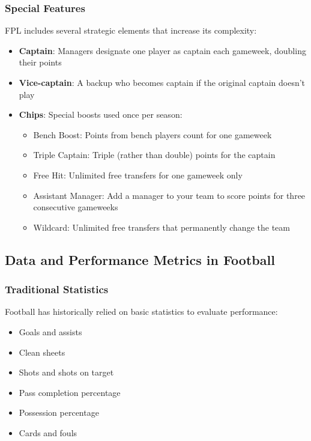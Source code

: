 \subsubsection{Special Features} \label{ch:special_features}

FPL includes several strategic elements that increase its complexity:
\begin{itemize}
    \item \textbf{Captain}: Managers designate one player as captain each gameweek, doubling their points
    \item \textbf{Vice-captain}: A backup who becomes captain if the original captain doesn't play
    \item \textbf{Chips}: Special boosts used once per season:
    \begin{itemize}
        \item Bench Boost: Points from bench players count for one gameweek
        \item Triple Captain: Triple (rather than double) points for the captain
        \item Free Hit: Unlimited free transfers for one gameweek only
        \item Assistant Manager: Add a manager to your team to score points for three consecutive gameweeks
        \item Wildcard: Unlimited free transfers that permanently change the team \cite{fpl2024rules}
    \end{itemize}
\end{itemize}

\subsection{Data and Performance Metrics in Football}

\subsubsection{Traditional Statistics}

Football has historically relied on basic statistics to evaluate performance:
\begin{itemize}
    \item Goals and assists
    \item Clean sheets
    \item Shots and shots on target
    \item Pass completion percentage
    \item Possession percentage
    \item Cards and fouls \cite{hughes2005}
\end{itemize}

